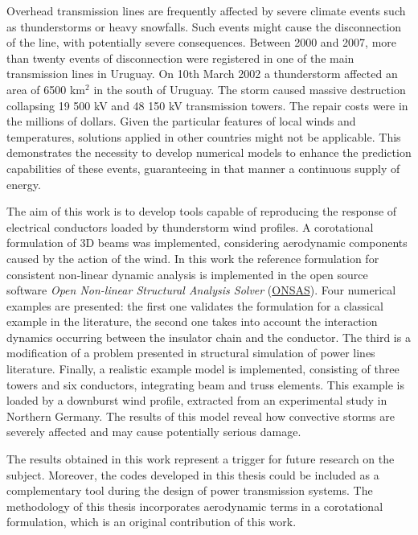 \begin{foreignabstract}
Overhead transmission lines are frequently affected by severe climate events such as thunderstorms or heavy snowfalls. Such events might cause the disconnection of the line, with potentially severe consequences. Between 2000 and 2007, more than twenty events of disconnection were registered in one of the main transmission lines in Uruguay. On 10th March 2002 a thunderstorm affected an area of 6500 km$^2$ in the south of Uruguay. The storm caused massive destruction collapsing 19 500 kV and 48 150 kV transmission towers. The repair costs were in the millions of dollars. Given the particular features of local winds and temperatures, solutions applied in other countries might not be applicable. This demonstrates the necessity to develop numerical models to enhance the prediction capabilities of these events, guaranteeing in that manner a continuous supply of energy.

The aim of this work is to develop tools capable of reproducing the response of electrical conductors loaded by  thunderstorm wind profiles. A corotational formulation of 3D beams was implemented, considering aerodynamic components caused by the action of the wind. In this work the reference formulation for consistent non-linear dynamic analysis is implemented in the open source software \emph{Open Non-linear Structural Analysis Solver} (\href{https://github.com/ONSAS/ONSAS.m/}{ONSAS}). Four numerical examples are presented: the first one validates the formulation for a classical example in the literature, the second one takes into account the interaction dynamics occurring between the insulator chain and the conductor. The third is a modification of a problem presented in structural simulation of power lines literature.  Finally, a realistic example model is implemented, consisting of three towers and six conductors, integrating beam and truss elements. This example is loaded by a downburst wind profile,  extracted from an experimental study in Northern Germany. The results of this model reveal how convective storms are severely affected and may cause potentially serious damage.

The results obtained in this work represent a trigger for future research on the subject. Moreover, the codes developed in this thesis could be included as a complementary tool during the design of power transmission systems. The methodology of this thesis incorporates aerodynamic terms in a corotational formulation, which is an original contribution of this work.  

\end{foreignabstract}